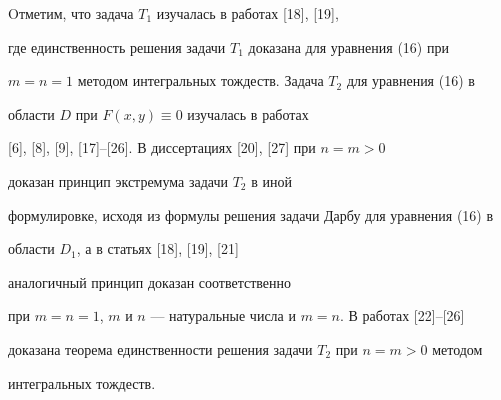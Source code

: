 \begin{note}


Oтметим, что задача $T_1$ изучалась в работах [18], [19],


где единственность решения задачи $T_1$ доказана для уравнения (16) при 


$m=n=1$ методом интегральных тождеств. Задача $T_2$ для уравнения (16) в


области $D$ при $F(x,y)\equiv 0$ изучалась в работах


[6], [8], [9], [17]--[26]. В диссертациях [20], [27] при $n=m>0$


доказан принцип экстремума задачи $T_2$ в иной 


формулировке, исходя из формулы решения задачи Дарбу для уравнения (16) в


области $D_1$, а в статьях [18], [19], [21]


аналогичный принцип доказан соответственно 


при $m=n=1$, $m$ и $n$ --- натуральные числа и $m=n$. В работах [22]--[26]


доказана теорема единственности решения задачи $T_2$ при $n=m>0$ методом 


интегральных тождеств.


\end{note}





